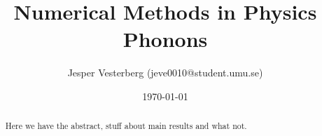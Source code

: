 \title{Numerical Methods in Physics \\ Phonons}
\author{Jesper Vesterberg (jeve0010@student.umu.se)}
\date{\today}

\begin{titlepage}
  \maketitle
  \thispagestyle{fancy}
  \rhead{\today}
  \begin{abstract}
    Here we have the abstract, stuff about main results and what not.
  \end{abstract}
\end{titlepage}
